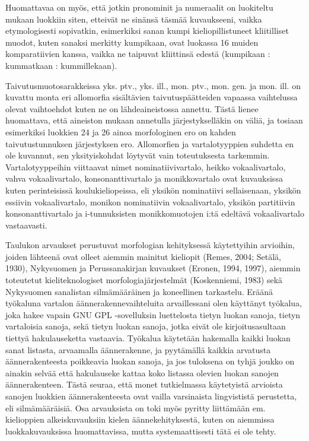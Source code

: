 \documentclass[free]{flammie}
\begin{document}
Huomattavaa on myös, että jotkin pronominit ja numeraalit on luokiteltu mukaan
luokkiin siten, etteivät ne sinänsä täsmää kuvaukseeni, vaikka etymologisesti sopivatkin, esimerkiksi sanan kumpi kieliopillistuneet kliitilliset muodot, kuten sanaksi merkitty kumpikaan, ovat luokassa 16 muiden komparatiivien kanssa, vaikka ne
taipuvat kliittinsä edestä (kumpikaan : kummatkaan : kummillekaan).

Taivutusmuotosarakkeissa yks. ptv., yks. ill., mon. ptv., mon. gen. ja mon. ill. on
kuvattu monta eri allomorfia sisältävien taivutuspäätteiden vapaassa vaihtelussa
olevat vaihtoehdot kuten ne on lähdeaineistossa annettu. Tästä lienee huomattava,
että aineiston mukaan annetulla järjestykselläkin on väliä, ja tosiaan esimerkiksi
luokkien 24 ja 26 ainoa morfologinen ero on kahden taivutustunnuksen järjestyksen ero.
Allomorfien ja vartalotyyppien suhdetta en ole kuvannut, sen yksityiskohdat löytyvät vain toteutuksesta tarkemmin. Vartalotyyppeihin viittaavat nimet nominatiivivartalo, heikko vokaalivartalo, vahva vokaalivartalo, konsonanttivartalo ja monikkovartalo ovat kuvauksissa kuten perinteisissä koulukieliopeissa, eli yksikön
nominatiivi sellaisenaan, yksikön essiivin vokaalivartalo, monikon nominatiivin
vokaalivartalo, yksikön partitiivin konsonanttivartalo ja i-tunnuksisten monikkomuotojen i:tä edeltävä vokaalivartalo vastaavasti.

Taulukon arvaukset perustuvat morfologian kehityksessä käytettyihin arvioihin,
joiden lähteenä ovat olleet aiemmin mainitut kieliopit (Remes, 2004; Setälä,
1930), Nykysuomen ja Perussanakirjan kuvaukset (Eronen, 1994, 1997), aiemmin toteutetut kieliteknologiset morfologiajärjestelmät (Koskenniemi, 1983) sekä
Nykysuomen sanalistan silmämääräinen ja koneellinen tarkastelu. Eräänä työkaluna vartalon äännerakennevaihteluita arvaillessani olen käyttänyt työkalua, joka
hakee vapain GNU GPL -sovelluksin luettelosta tietyn luokan sanoja, tietyn vartaloisia sanoja, sekä tietyn luokan sanoja, jotka eivät ole kirjoitusasultaan tiettyä
hakulauseketta vastaavia. Työkalua käytetään hakemalla kaikki luokan sanat listasta, arvaamalla äännerakenne, ja pyytämällä kaikkia arvatusta äännerakenteesta
poikkeavia luokan sanoja, ja jos tuloksena on tyhjä joukko on ainakin selvää että hakulauseke kattaa koko listassa olevien luokan sanojen äännerakenteen. Tästä
seuraa, että monet tutkielmassa käytetyistä arvioista sanojen luokkien äännerakenteesta ovat vailla varsinaista lingvististä perustetta, eli silmämääräisiä. Osa arvauksista on toki myös pyritty liittämään em. kielioppien alkeiskuvauksiin kielen
äännekehityksestä, kuten on aiemmissa luokkakuvauksissa huomattavissa, mutta
systemaattisesti tätä ei ole tehty.
\end{document}
